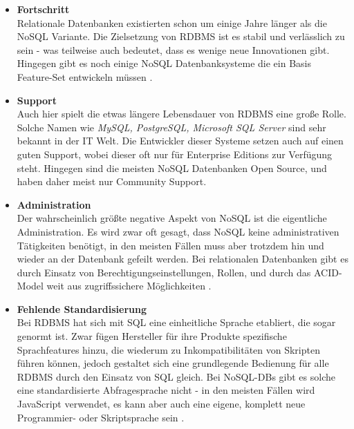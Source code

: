 \begin{itemize}
	\item \textbf{Fortschritt\\}
	Relationale Datenbanken existierten schon um einige Jahre länger als die NoSQL Variante. Die Zielsetzung von RDBMS ist es stabil und verlässlich zu sein - was teilweise auch bedeutet, dass es wenige neue Innovationen gibt. Hingegen gibt es noch einige NoSQL Datenbanksysteme die ein Basis Feature-Set entwickeln müssen \cite{MELD.CH2-noSQL.maturity}\cite{MELD.CH2-noSQL.considerations}.

	\item \textbf{Support\\}
	Auch hier spielt die etwas längere Lebensdauer von RDBMS eine große Rolle. Solche Namen wie \textit{MySQL, PostgreSQL, Microsoft SQL Server} sind sehr bekannt in der IT Welt. Die Entwickler dieser Systeme setzen auch auf einen guten Support, wobei dieser oft nur für Enterprise Editions zur Verfügung steht. Hingegen sind die meisten NoSQL Datenbanken Open Source, und haben daher meist nur Community Support\cite{MELD.CH2-noSQL.considerations}.

	\item \textbf{Administration\\}
	Der wahrscheinlich größte negative Aspekt von NoSQL ist die eigentliche Administration. Es wird zwar oft gesagt, dass NoSQL keine administrativen Tätigkeiten benötigt, in den meisten Fällen muss aber trotzdem hin und wieder an der Datenbank gefeilt werden. Bei relationalen Datenbanken gibt es durch Einsatz von Berechtigungseinstellungen, Rollen, und durch das ACID-Model weit aus zugriffssichere Möglichkeiten \cite{MELD.CH2-noSQL.administration}.

	\item \textbf{Fehlende Standardisierung\\}
	Bei RDBMS hat sich mit SQL eine einheitliche Sprache etabliert, die sogar genormt ist. Zwar fügen Hersteller für ihre Produkte spezifische Sprachfeatures hinzu, die wiederum zu Inkompatibilitäten von Skripten führen können, jedoch gestaltet sich eine grundlegende Bedienung für alle RDBMS durch den Einsatz von SQL gleich. Bei NoSQL-DBs gibt es solche eine standardisierte Abfragesprache nicht - in den meisten Fällen wird JavaScript verwendet, es kann aber auch eine eigene, komplett neue Programmier- oder Skriptsprache sein \cite{MELD.CH2-noSQL.maturity}\cite{MELD.CH2-noSQL.considerations}.
\end{itemize}

\clearpage